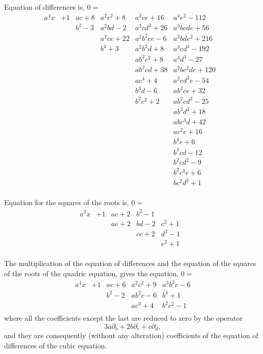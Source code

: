 \documentclass[12pt,a4paper]{article}
\theoremstyle{plain}
\begin{document}
\noindent
Equation  of  differences  is,  $0 =$
\[
\begin{array}{r|rrrrrr}
a^4 x & +1 & ac + 8 & a^2 c^2 + 8 & a^3 c e + 16 & a^4 e^2 - 112 & \\
& & b^2 - 3 & a^2 b d - 2 & a^3 c d^2 + 26 & a^3 b c d e + 56 & \\
& & & a^2 c e + 22 & a^2 b^2 c e - 6 & a^3 b d e^2 + 216 & \\
& & & b^4 + 3 & a^2 b^2 d + 8 & a^3 c d^3 - 192 & \\
& & & & a b^2 c^2 + 8 & a^3 d^4 - 27 & \\
& & & & a b^2 c d + 38 & a^2 b c^2 d e + 120 & \\
& & & & a c^4 + 4 & a^2 c d^2 e - 54 & \\
& & & & b^3 d - 6 & a b^3 c e + 32 & \\
& & & & b^2 c^2 + 2 & a b^2 c d^2 - 25 & \\
& & & & & a b^2 d^3 + 18 & \\
& & & & & a b c^3 d + 42 & \\
& & & & & a c^2 e + 16 & \\
& & & & & b^4 e + 6 & \\
& & & & & b^3 c d - 12 & \\
& & & & & b^2 c d^2 - 9 & \\
& & & & & b^2 c^3 e + 6 & \\
& & & & & b c^2 d^2 + 1 & \\
\end{array}
\]

\medskip
\noindent
Equation  for  the  squares  of  the  roots  is,  $0 =$
\[
\begin{array}{r|rrrrr}
a^2 x & +1 & ac + 2 & b^2 - 1 & & \\
& & ae + 2 & bd - 2 & c^2 + 1 & \\
& & & ce + 2 & d^2 - 1 & \\
& & & & e^2 + 1 & \\
\end{array}
\]

\medskip

The  multiplication  of  the  equation  of  differences  and  the  equation  of  the  squares
of  the  roots  of  the  quadric  equation,  gives  the  equation,  $0 =$
\[
\begin{array}{r|rrrr}
a^4 x & +1 & ac + 6 & a^2 c^2 + 9 & a^3 b^2 c - 6 \\
& & b^2 - 2 & a b^2 c - 6 & b^4 + 1 \\
& & & a c^3 + 4 & b^2 c^2 - 1 \\
\end{array}
\]
where  all  the  coefficients  except  the  last  are  reduced  to  zero  by  the  operator
\[
3a\partial_b + 2b\partial_c + c\partial_d,
\]
and  they  are  consequently  (without  any  alteration)  coefficients  of  the  equation  of  differences  of  the  cubic  equation.
\end{document}
